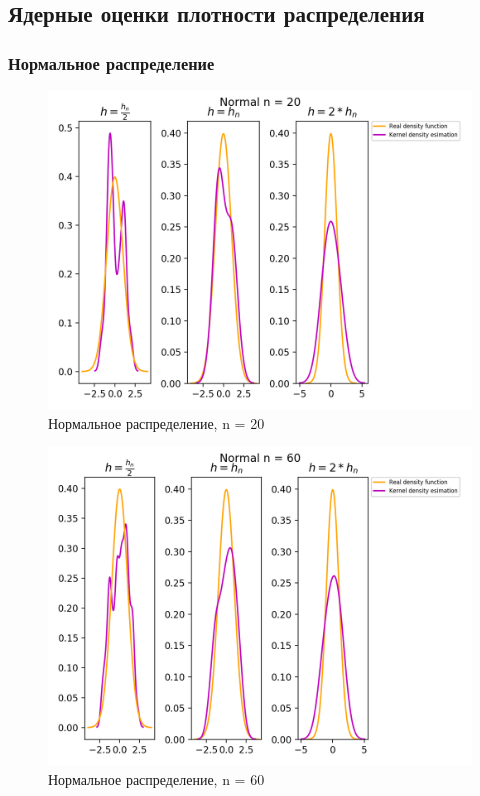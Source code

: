 \subsection{Ядерные оценки плотности распределения}

\subsubsection{Нормальное распределение}
\begin{figure}[H]
	\begin{center}
		\includegraphics[scale=0.7]{fig/Normal20_kde.png}
		\caption{Нормальное распределение, n = 20} 
		\label{pic:pic_name}
	\end{center}
\end{figure}

\begin{figure}[H]
	\begin{center}
		\includegraphics[scale=0.7]{fig/Normal60_kde.png}
		\caption{Нормальное распределение, n = 60} 
		\label{pic:pic_name}
	\end{center}
\end{figure}

